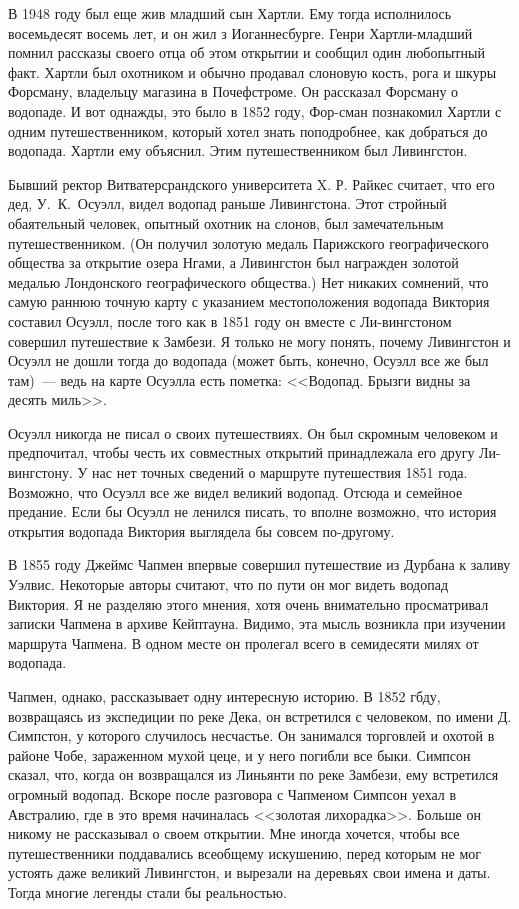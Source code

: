 \documentclass[12pt,a4paper,twoside,openany,svgnames]{memoir}
\begin{document}
В 1948 году был еще жив младший сын Хартли. Ему тогда исполнилось восемьдесят восемь лет, и он жил з Иоганнесбурге. Генри Хартли-младший помнил рассказы своего отца об этом открытии и сообщил один любопытный факт. Хартли был охотником и обычно продавал слоновую кость, рога и шкуры Форсману, владельцу магазина в Почефстроме. Он рассказал Форсману о водопаде. И вот однажды, это было в 1852 году, Фор-сман познакомил Хартли с одним путешественником, который хотел знать поподробнее, как добраться до водопада. Хартли ему объяснил. Этим путешественником был Ливингстон.

Бывший ректор Витватерсрандского университета X. Р. Райкес считает, что его дед, У.~К.~Осуэлл, видел водопад раньше Ливингстона. Этот стройный обаятельный человек, опытный охотник на слонов, был замечательным путешественником. (Он получил золотую медаль Парижского географического общества за открытие озера Нгами, а Ливингстон был награжден золотой медалью Лондонского географического общества.) Нет никаких сомнений, что самую раннюю точную карту с указанием местоположения водопада Виктория составил Осуэлл, после того как в 1851 году он вместе с Ли-вингстоном совершил путешествие к Замбези. Я только не могу понять, почему Ливингстон и Осуэлл не дошли тогда до водопада (может быть, конечно, Осуэлл все же был там)~--- ведь на карте Осуэлла есть пометка: <<Водопад. Брызги видны за десять миль>>.

Осуэлл никогда не писал о своих путешествиях. Он был скромным человеком и предпочитал, чтобы честь их совместных открытий принадлежала его другу Ли-вингстону. У нас нет точных сведений о маршруте путешествия 1851 года. Возможно, что Осуэлл все же видел великий водопад. Отсюда и семейное предание. Если бы Осуэлл не ленился писать, то вполне возможно, что история открытия водопада Виктория выглядела бы совсем по-другому.

В 1855 году Джеймс Чапмен впервые совершил путешествие из Дурбана к заливу Уэлвис. Некоторые авторы считают, что по пути он мог видеть водопад Виктория. Я не разделяю этого мнения, хотя очень внимательно просматривал записки Чапмена в архиве Кейптауна. Видимо, эта мысль возникла при изучении маршрута Чапмена. В одном месте он пролегал всего в семидесяти милях от водопада.

Чапмен, однако, рассказывает одну интересную историю. В 1852 гбду, возвращаясь из экспедиции по реке Дека, он встретился с человеком, по имени Д. Симпстон, у которого случилось несчастье. Он занимался торговлей и охотой в районе Чобе, зараженном мухой цеце, и у него погибли все быки. Симпсон сказал, что, когда он возвращался из Линьянти по реке Замбези, ему встретился огромный водопад. Вскоре после разговора с Чапменом Симпсон уехал в Австралию, где в это время начиналась <<золотая лихорадка>>. Больше он никому не рассказывал о своем открытии. Мне иногда хочется, чтобы все путешественники поддавались всеобщему искушению, перед которым не мог устоять даже великий Ливингстон, и вырезали на деревьях свои имена и даты. Тогда многие легенды стали бы реальностью.
\end{document}
